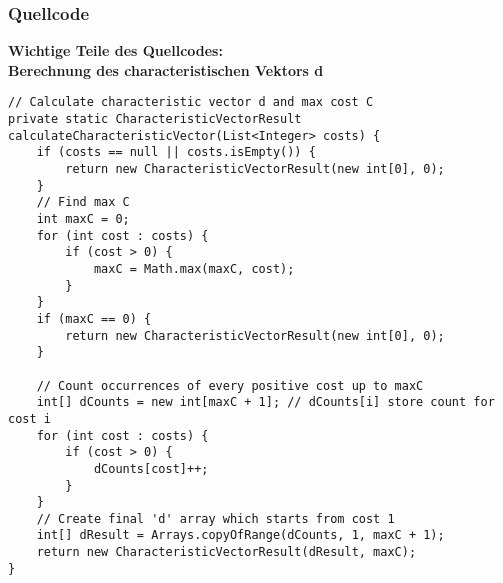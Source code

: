 \documentclass[a4paper,10pt,ngerman]{scrartcl}
\begin{document}
\subsubsection{Quellcode}
\textbf{Wichtige Teile des Quellcodes:}
\\\newline
\textbf{Berechnung des characteristischen Vektors d}
\begin{lstlisting}
// Calculate characteristic vector d and max cost C
private static CharacteristicVectorResult calculateCharacteristicVector(List<Integer> costs) {
    if (costs == null || costs.isEmpty()) {
        return new CharacteristicVectorResult(new int[0], 0);
    }
    // Find max C
    int maxC = 0;
    for (int cost : costs) {
        if (cost > 0) {
            maxC = Math.max(maxC, cost);
        }
    }
    if (maxC == 0) {
        return new CharacteristicVectorResult(new int[0], 0);
    }

    // Count occurrences of every positive cost up to maxC
    int[] dCounts = new int[maxC + 1]; // dCounts[i] store count for cost i
    for (int cost : costs) {
        if (cost > 0) {
            dCounts[cost]++;
        }
    }
    // Create final 'd' array which starts from cost 1
    int[] dResult = Arrays.copyOfRange(dCounts, 1, maxC + 1);
    return new CharacteristicVectorResult(dResult, maxC);
}
\end{lstlisting}
\end{document}
